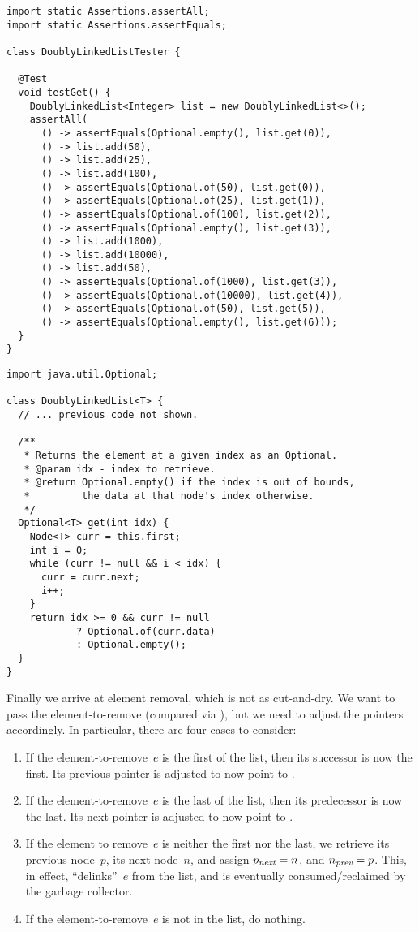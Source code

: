 \newpage %
\begin{lstlisting}[language=MyJava]
import static Assertions.assertAll;
import static Assertions.assertEquals;

class DoublyLinkedListTester {

  @Test
  void testGet() {
    DoublyLinkedList<Integer> list = new DoublyLinkedList<>();
    assertAll(
      () -> assertEquals(Optional.empty(), list.get(0)),
      () -> list.add(50),
      () -> list.add(25),
      () -> list.add(100),
      () -> assertEquals(Optional.of(50), list.get(0)),
      () -> assertEquals(Optional.of(25), list.get(1)),
      () -> assertEquals(Optional.of(100), list.get(2)),
      () -> assertEquals(Optional.empty(), list.get(3)),
      () -> list.add(1000),
      () -> list.add(10000),
      () -> list.add(50),
      () -> assertEquals(Optional.of(1000), list.get(3)),
      () -> assertEquals(Optional.of(10000), list.get(4)),
      () -> assertEquals(Optional.of(50), list.get(5)),
      () -> assertEquals(Optional.empty(), list.get(6)));
  }
}
\end{lstlisting}

\begin{lstlisting}[language=MyJava]
import java.util.Optional;

class DoublyLinkedList<T> {
  // ... previous code not shown.

  /**
   * Returns the element at a given index as an Optional.
   * @param idx - index to retrieve.
   * @return Optional.empty() if the index is out of bounds,
   *         the data at that node's index otherwise.
   */
  Optional<T> get(int idx) {
    Node<T> curr = this.first;
    int i = 0;
    while (curr != null && i < idx) {
      curr = curr.next;
      i++;
    }
    return idx >= 0 && curr != null
            ? Optional.of(curr.data)
            : Optional.empty();
  }
}
\end{lstlisting}

Finally we arrive at element removal, which is not as cut-and-dry. We want to pass the element-to-remove (compared via ), but we need to adjust the pointers accordingly. In particular, there are four cases to consider:

\begin{enumerate}[label=(\alph*)]
  \item If the element-to-remove~$e$ is the first of the list, then its successor is now the first. Its previous pointer is adjusted to now point to .
  \item If the element-to-remove~$e$ is the last of the list, then its predecessor is now the last. Its next pointer is adjusted to now point to .
  \item If the element to remove~$e$ is neither the first nor the last, we retrieve its previous node~$p$, its next node~$n$, and assign $p_\emph{next} = n$, and $n_\emph{prev} = p$. This, in effect, ``delinks''~$e$ from the list, and is eventually consumed/reclaimed by the garbage collector.
  \item If the element-to-remove~$e$ is not in the list, do nothing.
\end{enumerate}

